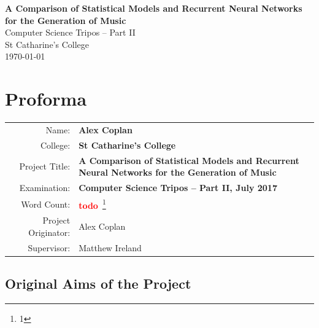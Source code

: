 \documentclass[12pt,a4paper,twoside,openright]{report}
\newcommand{\todo}{\textcolor{red}{\textbf{todo}~}}
\begin{document}
\cleanlookdateon


\pagestyle{empty}


\vspace*{60mm}
\begin{center}
\Huge
\textbf{A Comparison of Statistical Models and Recurrent Neural Networks for the
Generation of Music} \\[5mm]
Computer Science Tripos -- Part II \\[5mm]
St Catharine's College \\[5mm]
\today  %
\end{center}


\pagestyle{plain}

\chapter*{Proforma}

{\large
\begin{tabular}{r p{10.5cm}}
Name:               & \bf Alex Coplan                       \\
College:            & \bf St Catharine's College                     \\
Project Title:      & \bf A Comparison of Statistical Models and Recurrent
Neural Networks for the \newline Generation of Music \\
Examination:        & \bf Computer Science Tripos -- Part II, July 2017  \\
Word Count:         & \todo\footnote{1} \\
Project Originator: & Alex Coplan \\
Supervisor:         & Matthew Ireland                    \\ 
\end{tabular}
}


\section*{Original Aims of the Project}
\end{document}
